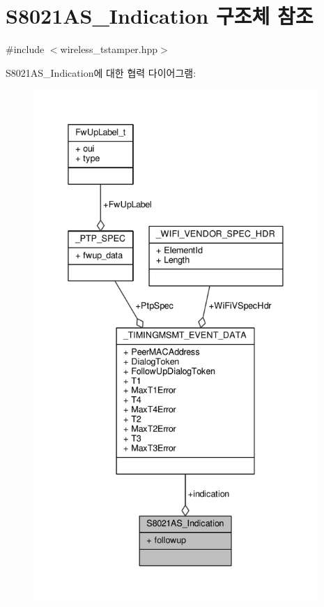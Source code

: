 \hypertarget{struct_s8021_a_s___indication}{}\section{S8021\+A\+S\+\_\+\+Indication 구조체 참조}
\label{struct_s8021_a_s___indication}


{\ttfamily \#include $<$wireless\+\_\+tstamper.\+hpp$>$}



S8021\+A\+S\+\_\+\+Indication에 대한 협력 다이어그램\+:
\nopagebreak
\begin{figure}[H]
\begin{center}
\leavevmode
\includegraphics[height=550pt]{struct_s8021_a_s___indication__coll__graph}
\end{center}
\end{figure}
